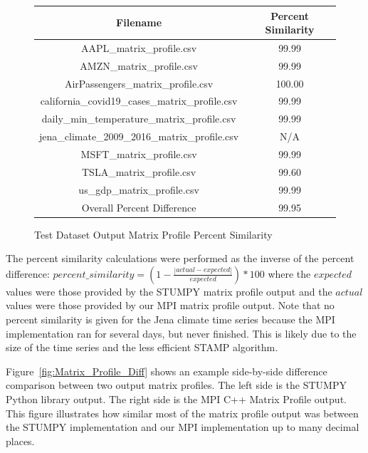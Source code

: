 \documentclass[conference]{IEEEtran}
\begin{document}
\begin{center}
\begin{figure}
\caption{Test Dataset Output Matrix Profile Percent Similarity}
\begin{tabular}{|c|c|}
\hline
\textbf{Filename} & \textbf{Percent Similarity} \\ \hline \hline
AAPL\_matrix\_profile.csv & 99.99 \\ \hline
AMZN\_matrix\_profile.csv & 99.99 \\ \hline
AirPassengers\_matrix\_profile.csv & 100.00 \\ \hline
california\_covid19\_cases\_matrix\_profile.csv & 99.99 \\ \hline
daily\_min\_temperature\_matrix\_profile.csv & 99.99 \\ \hline
jena\_climate\_2009\_2016\_matrix\_profile.csv & N/A \\ \hline
MSFT\_matrix\_profile.csv & 99.99 \\ \hline
TSLA\_matrix\_profile.csv & 99.60 \\ \hline
us\_gdp\_matrix\_profile.csv & 99.99 \\ \hline \hline
Overall Percent Difference & 99.95 \\ \hline
\hline
\end{tabular}
\label{fig:Matrix_Profile_Percent_Similarity}
\end{figure}
\end{center}

The percent similarity calculations were performed as the inverse of the percent difference: $percent\_similarity = \left(1 - \frac{|actual - expected|}{expected}\right) * 100$ where the $expected$ values were those provided by the STUMPY matrix profile output and the $actual$ values were those provided by our MPI matrix profile output. Note that no percent similarity is given for the Jena climate time series because the MPI implementation ran for several days, but never finished.  This is likely due to the size of the time series and the less efficient STAMP algorithm.


Figure~\ref{fig:Matrix_Profile_Diff} shows an example side-by-side difference comparison between two output matrix profiles.  The left side is the STUMPY Python library output.  The right side is the MPI C++ Matrix Profile output.  This figure illustrates how similar most of the matrix profile output was between the STUMPY implementation and our MPI implementation up to many decimal places.
\end{document}
